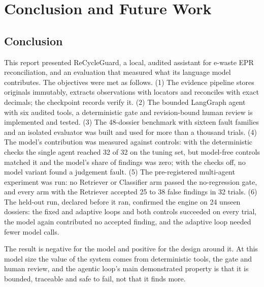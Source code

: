 \chapter{Conclusion and Future Work}

\section{Conclusion}
This report presented ReCycleGuard, a local, audited assistant for e-waste EPR reconciliation, and an
evaluation that measured what its language model contributes. The objectives were met as follows.
(1) The evidence pipeline stores originals immutably, extracts observations with locators and
reconciles with exact decimals; the checkpoint records verify it. (2) The bounded LangGraph agent with
six audited tools, a deterministic gate and revision-bound human review is implemented and tested.
(3) The 48-dossier benchmark with sixteen fault families and an isolated evaluator was built and used
for more than a thousand trials. (4) The model's contribution was measured against controls: with the
deterministic checks the single agent reached 32 of 32 on the tuning set, but model-free controls
matched it and the model's share of findings was zero; with the checks off, no model variant found a
judgement fault. (5) The pre-registered multi-agent experiment was run: no Retriever or Classifier arm
passed the no-regression gate, and every arm with the Retriever accepted 25 to 38 false findings in
32 trials. (6) The held-out run, declared before it ran, confirmed the engine on 24 unseen dossiers: the fixed
and adaptive loops and both controls succeeded on every trial, the model again contributed no
accepted finding, and the adaptive loop needed fewer model calls.

The result is negative for the model and positive for the design around it. At this model size the
value of the system comes from deterministic tools, the gate and human review, and the agentic loop's
main demonstrated property is that it is bounded, traceable and safe to fail, not that it finds more.

